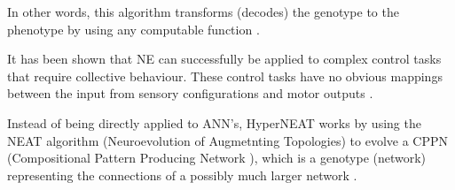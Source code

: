 In other words, this algorithm transforms (decodes) the genotype to the phenotype by using any computable function \cite{koutnik2010evolving}.


It has been shown that NE can successfully be applied to complex control tasks that require collective behaviour. These control tasks have no obvious mappings between the input from sensory configurations and motor outputs \cite{NitschkeSaEC2012}.


Instead of being directly applied to ANN's, HyperNEAT works by using the NEAT algorithm (Neuroevolution of Augmetnting Topologies) to evolve a CPPN (Compositional Pattern Producing Network \cite{StanleyMiikkulainen2002}), which is a genotype (network) representing the connections of a possibly much larger network \cite{RefWorks:14}.












